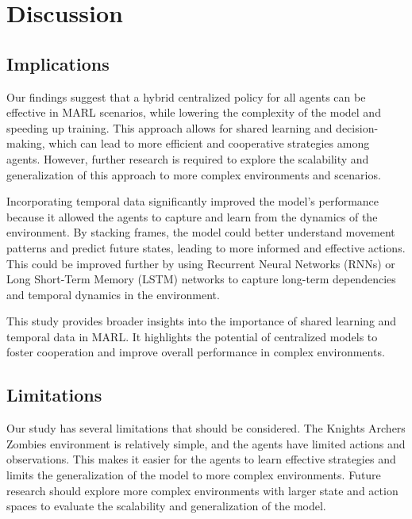 \documentclass{article}
\begin{document}

\section{Discussion}

\subsection{Implications}
Our findings suggest that a hybrid centralized policy for all agents can be 
effective in MARL scenarios, while lowering the 
complexity of the model and speeding up training. This approach allows for shared learning and decision-making, which can lead to 
more efficient and cooperative strategies among agents. However, further research
is required to explore the scalability and generalization of this approach to
more complex environments and scenarios.

Incorporating temporal data significantly improved the model's performance 
because it allowed the agents to capture and learn from the dynamics of the 
environment. By stacking frames, the model could better understand movement 
patterns and predict future states, leading to more informed and effective actions. 
This could be improved further by using Recurrent Neural Networks (RNNs) or
Long Short-Term Memory (LSTM) networks to capture long-term dependencies and
temporal dynamics in the environment.

This study provides broader insights into the importance of shared learning 
and temporal data in MARL. It highlights the 
potential of centralized models to foster cooperation and improve overall 
performance in complex environments.

\subsection{Limitations}
Our study has several limitations that should be considered. The Knights Archers Zombies environment is relatively simple,
and the agents have limited actions and observations. This makes it easier for the agents to learn effective strategies
and limits the generalization of the model to more complex environments. Future research should explore more complex
environments with larger state and action spaces to evaluate the scalability and generalization of the model.
\end{document}
